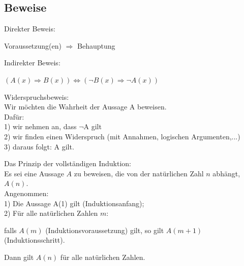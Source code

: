 \subsection[]{Beweise}
\begin{definition}
Direkter Beweis:
\begin{center}
     Voraussetzung(en) $\Rightarrow$ Behauptung
\end{center}
\end{definition}
\begin{definition}
Indirekter Beweis:
\begin{center}
    $(A(x) \Rightarrow B(x)) \Leftrightarrow (\neg B(x) \Rightarrow \neg A(x))$
\end{center}
\end{definition}
\begin{definition}
Widerspruchsbeweis:\\
Wir möchten die Wahrheit der Aussage A beweisen.\\
Dafür:\\
1) wir nehmen an, dass $\neg$A gilt\\
2) wir finden einen Widerspruch (mit Annahmen, logischen Argumenten,...)\\
3) daraus folgt: A gilt.
\end{definition}
\begin{definition}
Das Prinzip der vollständigen Induktion:\\
Es sei eine Aussage $A$ zu beweisen, die von der natürlichen Zahl $n$ abhängt, $A(n)$.\\
Angenommen:\\
1) Die Aussage A(1) gilt (Induktionsanfang);\\
2) Für alle natürlichen Zahlen $m$:
\begin{center}
    falls $A(m)$ (Induktionsvoraussetzung) gilt, so gilt $A(m+1)$ (Induktionsschritt). 
\end{center}
Dann gilt $A(n)$ für alle natürlichen Zahlen.
\end{definition}
